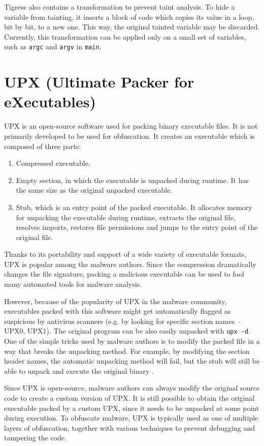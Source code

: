 \documentclass[
  digital, %
  notable,   %
  twoside, %
  nolof,     %
  nolot,     %
]{fithesis3}
\theoremstyle{definition}
\begin{document}
Tigress also contains a transformation to prevent taint analysis. To hide a variable from tainting, it inserts a block of code which copies its value in a loop, bit by bit, to a new one. This way, the original tainted variable may be discarded. Currently, this transformation can be applied only on a small set of variables, such as \texttt{argc} and \texttt{argv} in \texttt{main}.

\section{UPX (Ultimate Packer for eXecutables)}
UPX is an open-source software used for packing binary executable files. It is not primarily developed to be used for obfuscation. It creates an executable which is composed of three parts:
\begin{enumerate}
    \item Compressed executable,
    \item Empty section, in which the executable is unpacked during runtime. It has the same size as the original unpacked executable.
    \item Stub, which is an entry point of the packed executable. It allocates memory for unpacking the executable during runtime, extracts the original file, resolves imports, restores file permissions and jumps to the entry point of the original file.
\end{enumerate}

Thanks to its portability and support of a wide variety of executable formats, UPX is popular among the malware authors. Since the compression dramatically changes the file signature, packing a malicious executable can be used to fool many automated tools for malware analysis. 

However, because of the popularity of UPX in the malware community, executables packed with this software might get automatically flagged as suspicious by antivirus scanners (e.g. by looking for specific section names -- UPX0, UPX1). The original program can be also easily unpacked with \texttt{upx -d}. One of the simple tricks used by malware authors is to modify the packed file in a way that breaks the unpacking method. For example, by modifying the section header names, the automatic unpacking method will fail, but the stub will still be able to unpack and execute the original binary \cite{simple_upx}.

Since UPX is open-source, malware authors can always modify the original source code to create a custom version of UPX. It is still possible to obtain the original executable packed by a custom UPX, since it needs to be unpacked at some point during execution. To obfuscate malware, UPX is typically used as one of multiple layers of obfuscation, together with various techniques to prevent debugging and tampering the code. 
\end{document}
